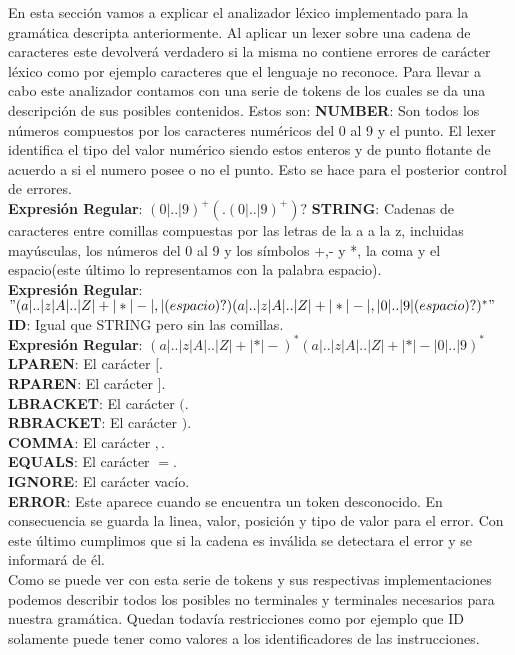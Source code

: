 En esta sección vamos a explicar el analizador léxico implementado para la gramática descripta anteriormente. Al aplicar un
lexer sobre una cadena de caracteres este devolverá verdadero si la misma no contiene errores de carácter léxico como por
ejemplo caracteres que el lenguaje no reconoce. Para llevar a cabo este analizador contamos con una serie de tokens de
los cuales se da una descripción de sus posibles contenidos. Estos son:
\newline
\newline
\textbf{NUMBER}: Son todos los números compuestos por los caracteres numéricos del 0 al 9 y el punto. El lexer identifica el tipo
del valor numérico siendo estos enteros y de punto flotante de acuerdo a si el numero posee o no el punto. Esto se hace
para el posterior control de errores.\\
\textbf{Expresi\'on Regular}: $(0|..|9)^{+}(.(0|..|9)^{+})?$
\newline
\newline
\textbf{STRING}: Cadenas de caracteres entre comillas compuestas por las letras de la a a la z, incluidas mayúsculas, los números del
0 al 9 y los símbolos +,- y *, la coma y el espacio(este último lo representamos con la palabra espacio).\\
\textbf{Expresi\'on Regular}: $"(a|..|z|A|..|Z|+|*|-|,|(espacio)?)(a|..|z|A|..|Z|+|*|-|,|0|..|9|(espacio)?)^{*}"$
\newline
\newline
\textbf{ID}: Igual que STRING pero sin las comillas.\\
\textbf{Expresi\'on Regular}: $(a|..|z|A|..|Z|+|*|-)^{*}(a|..|z|A|..|Z|+|*|-|0|..|9)^{*}$
\newline
\newline
\textbf{LPAREN}: El carácter $[$.\\
\newline
\textbf{RPAREN}: El carácter $]$.\\
\newline
\textbf{LBRACKET}: El carácter $($.\\
\newline
\textbf{RBRACKET}: El carácter $)$.\\
\newline
\textbf{COMMA}: El carácter $,$.\\
\newline
\textbf{EQUALS}: El carácter $=$.\\
\newline
\textbf{IGNORE}: El carácter vacío.\\
\newline
\textbf{ERROR}: Este aparece cuando se encuentra un token desconocido. En consecuencia se guarda la linea, valor, posición y
tipo de valor para el error. Con este último cumplimos que si la cadena es inválida se detectara el error y se informará de él.\\
\newline
Como se puede ver con esta serie de tokens y sus respectivas implementaciones podemos describir todos los posibles no terminales y terminales
necesarios para nuestra gramática. Quedan todavía restricciones como por ejemplo que ID solamente puede tener como valores a los
identificadores de las instrucciones.\\
